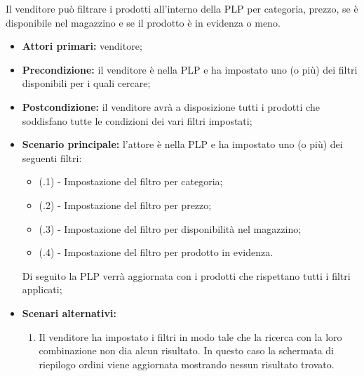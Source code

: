 Il venditore può filtrare i prodotti all'interno della PLP per categoria, prezzo, se è disponibile nel magazzino e se il prodotto è in evidenza o meno.
\begin{itemize}
	\item \textbf{Attori primari:} venditore;
	\item \textbf{Precondizione:} il venditore è nella PLP e ha impostato uno (o più) dei filtri disponibili per i quali cercare;
	\item \textbf{Postcondizione:} il venditore avrà a disposizione tutti i prodotti che soddisfano tutte le condizioni dei vari filtri impostati;
	\item \textbf{Scenario principale:} l'attore è nella PLP e ha impostato uno (o più) dei seguenti filtri:
	\begin{itemize}
		\item (\actualUC.1) - Impostazione del filtro per categoria;
		\item (\actualUC.2) - Impostazione del filtro per prezzo;
		\item (\actualUC.3) - Impostazione del filtro per disponibilità nel magazzino;
		\item (\actualUC.4) - Impostazione del filtro per prodotto in evidenza.
	\end{itemize}
	Di seguito la PLP verrà aggiornata con i prodotti che rispettano tutti i filtri applicati;
	\item \textbf{Scenari alternativi:}
	\begin{enumerate}[label=\lett]
		\item Il venditore ha impostato i filtri in modo tale che la ricerca con la loro combinazione non dia alcun risultato. In questo caso la schermata di riepilogo ordini viene aggiornata mostrando nessun risultato trovato.
	\end{enumerate}
\end{itemize}


